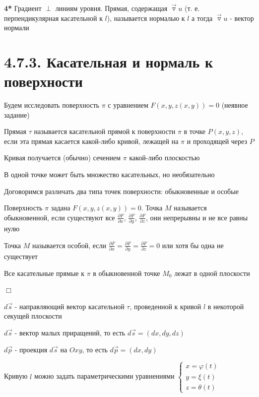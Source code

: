\documentclass[12pt]{article}
\begin{document}
    \textbf{4*} Градиент $\perp$ линиям уровня.
    Прямая, содержащая $\overrightarrow{\triangledown} u$ (т. е. перпендикулярная касательной к $l$), называется нормалью к $l$
    а тогда $\overrightarrow{\triangledown} u$ - вектор нормали

    \hypertarget{tangentandnormaltosurface}{}

    \section{4.7.3. Касательная и нормаль к поверхности}

    Будем исследовать поверхность $\pi$ с уравнением $F(x, y, z(x, y)) = 0$ (неявное задание)

    \hypertarget{tangenttosurface}{}

    \Def Прямая $\tau$ называется касательной прямой к поверхности $\pi$ в точке $P(x, y, z)$,
    если эта прямая касается какой-либо кривой, лежащей на $\pi$ и проходящей через $P$

    \Nota Кривая получается (обычно) сечением $\pi$ какой-либо плоскостью

    \Nota В одной точке может быть множество касательных, но необязательно

    \Nota Договоримся различать два типа точек поверхности: обыкновенные и особые

    \Def Поверхность $\pi$ задана $F(x, y, z(x, y)) = 0$. Точка $M$ называется обыкновенной, если существуют
    все $\frac{\partial F}{\partial x}$, $\frac{\partial F}{\partial y}$, $\frac{\partial F}{\partial z}$,
    они непрерывны и не все равны нулю

    \Def Точка $M$ называется особой, если $\frac{\partial F}{\partial x} = \frac{\partial F}{\partial y} = \frac{\partial F}{\partial z} = 0$
    или хотя бы одна не существует

    \Th Все касательные прямые к $\pi$ в обыкновенной точке $M_0$ лежат в одной плоскости

    $\Box$

    $d \overrightarrow{s}$ - направляющий вектор касательной $\tau$, проведенной к кривой $l$ в некоторой секущей плоскости

    $d \overrightarrow{s}$ - вектор малых приращений, то есть $d \overrightarrow{s} = (dx, dy, dz)$

    $d \overrightarrow{p}$ - проекция $d \overrightarrow{s}$ на $Oxy$, то есть $d \overrightarrow{p} = (dx, dy)$

    Кривую $l$ можно задать параметрическими уравнениями $\begin{cases}x = \varphi(t) \\ y = \xi(t) \\ z = \theta(t)\end{cases}$
\end{document}
